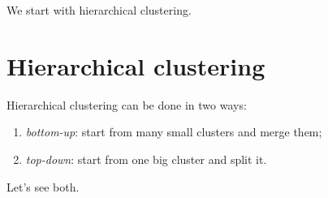 \documentclass[a4paper,12pt,oneside]{report}
\begin{document}
We start with hierarchical clustering.

\section{Hierarchical clustering}

Hierarchical clustering can be done in two ways:
\newcommand{\hcstage}[2]{%
  \begin{scope}[xshift=#1cm]
    \coordinate (h1) at (0,0.45);  \coordinate (h2) at (0.6,0);
    \coordinate (h3) at (2.1,0.38); \coordinate (h4) at (2.7,0);
    \ifnum#2=4
      \hull{ClA}{(h1) circle (0.01)} \hull{ClB}{(h2) circle (0.01)}
      \hull{ClC}{(h3) circle (0.01)} \hull{ClD}{(h4) circle (0.01)}
      \foreach \h/\c in {h1/ClA,h2/ClB,h3/ClC,h4/ClD}
        \node[clpt=\c] at (\h) {};
    \fi
    \ifnum#2=2
      \hull{ClA}{(h1) -- (h2)} \hull{ClC}{(h3) -- (h4)}
      \foreach \h/\c in {h1/ClA,h2/ClA,h3/ClC,h4/ClC}
        \node[clpt=\c] at (\h) {};
    \fi
    \ifnum#2=1
      \hull{ClA}{(h1) -- (h3) -- (h4) -- (h2) -- cycle}
      \foreach \h in {h1,h2,h3,h4} \node[clpt=ClA] at (\h) {};
    \fi
    \node[font=\scriptsize,gray] at (1.35,-0.8)
      {$#2$ cluster\ifnum#2>1 s\fi};
  \end{scope}}
\begin{enumerate}
  \item \emph{bottom-up}: start from many small clusters and merge
    them;
    \begin{center}
    \end{center}
  \item \emph{top-down}: start from one big cluster and split it.
    \begin{center}
    \end{center}
\end{enumerate}
Let's see both.
\end{document}
